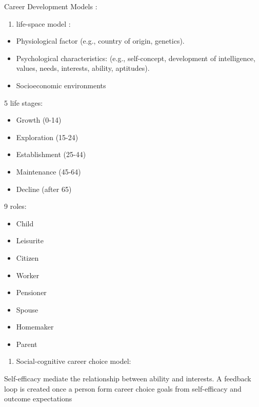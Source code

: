\documentclass[
]{book}
\providecommand{\tightlist}{%
  \setlength{\itemsep}{0pt}\setlength{\parskip}{0pt}}
\begin{document}
Career Development Models :

\begin{enumerate}
\def\labelenumi{\arabic{enumi}.}
\tightlist
\item
  life-space model \citep{Vondracek_2019}:
\end{enumerate}

\begin{itemize}
\tightlist
\item
  Physiological factor (e.g., country of origin, genetics).
\item
  Psychological characteristics: (e.g., self-concept, development of intelligence, values, needs, interests, ability, aptitudes).
\item
  Socioeconomic environments
\end{itemize}

5 life stages:

\begin{itemize}
\tightlist
\item
  Growth (0-14)
\item
  Exploration (15-24)
\item
  Establishment (25-44)
\item
  Maintenance (45-64)
\item
  Decline (after 65)
\end{itemize}

9 roles:

\begin{itemize}
\tightlist
\item
  Child
\item
  Leisurite
\item
  Citizen
\item
  Worker
\item
  Pensioner
\item
  Spouse
\item
  Homemaker
\item
  Parent
\end{itemize}

\begin{enumerate}
\def\labelenumi{\arabic{enumi}.}
\setcounter{enumi}{1}
\tightlist
\item
  Social-cognitive career choice model: \citep{Lent_1994}
\end{enumerate}

Self-efficacy mediate the relationship between ability and interests.
A feedback loop is created once a person form career choice goals from self-efficacy and outcome expectations
\end{document}
